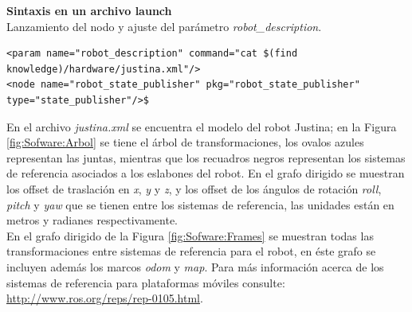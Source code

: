 \documentclass[a4paper,usenames,dvipsnames,svgnames,table]{book}
\begin{document}
\textbf{Sintaxis en un archivo launch}\\
Lanzamiento del nodo y ajuste del parámetro \textit{robot\_description}.
\begin{verbatim}
<param name="robot_description" command="cat $(find knowledge)/hardware/justina.xml"/>
<node name="robot_state_publisher" pkg="robot_state_publisher" type="state_publisher"/>$
\end{verbatim}

En el archivo \textit{justina.xml} se encuentra el modelo del robot Justina; en la Figura  \ref{fig:Sofware:Arbol} se tiene el árbol de transformaciones, los ovalos azules representan las juntas, mientras que los recuadros negros representan los sistemas de referencia asociados a los eslabones del robot. En el grafo dirigido se muestran los offset de traslación en \textit{x}, \textit{y} y \textit{z}, y los offset de los ángulos de rotación \textit{roll}, \textit{pitch} y \textit{yaw} que se tienen entre los sistemas de referencia, las unidades están en metros y radianes respectivamente.\\

En el grafo dirigido de la Figura \ref{fig:Sofware:Frames} se muestran todas las transformaciones entre sistemas de referencia para el robot, en éste grafo se incluyen además los marcos \textit{odom} y \textit{map}. Para más información acerca de los sistemas de referencia para plataformas móviles consulte: \url{http://www.ros.org/reps/rep-0105.html}.
\end{document}
